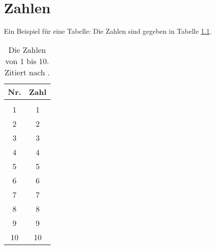 \chapter{Zahlen}
Ein Beispiel f\"ur eine Tabelle: Die Zahlen sind gegeben in Tabelle \ref{tab-zahlen}.

\begin{table}
\begin{center}
\begin{tabular}{c|c}
Nr. & Zahl \\
\hline{} \\
1 & 1\\
2 & 2\\
3 & 3\\
4 & 4\\
5 & 5\\
6 & 6\\
7 & 7\\
8 & 8\\
9 & 9\\
10 & 10 \\
\end{tabular}
\end{center}
\caption{Die Zahlen von 1 bis 10. Zitiert nach \cite{HaugKoch2004}.}
\label{tab-zahlen}
\end{table} 
